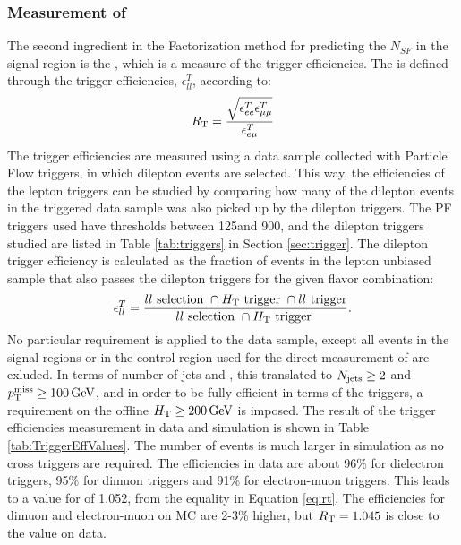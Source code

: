 \subsubsection*{Measurement of \RT}\label{sec:rt}
\noindent
\justify
The second ingredient in the Factorization method for predicting the $N_{SF}$ in the signal region is the \RT, which is a measure of the trigger efficiencies. 
The \RT is defined through the trigger efficiencies, $\epsilon_{ll}^{T}$,  according to:
\begin{equation}
\label{eq:masterformulaExp}
    R_{\text{T}} = \frac{\sqrt{\epsilon^{T}_{ee}\epsilon^{T}_{\mu\mu}}}{\epsilon^{T}_{e\mu}}
\end{equation}                                               
The trigger efficiencies are measured using a data sample collected with Particle Flow \HT triggers, in which dilepton events are selected. 
This way, the efficiencies of the lepton triggers can be studied by comparing how many of the dilepton events in the \HT triggered data sample was also picked up by the dilepton triggers. 
The PF \HT triggers used have thresholds between 125\GeV and 900\GeV, and the dilepton triggers studied are listed in Table \ref{tab:triggers} in Section \ref{sec:trigger}. 
The dilepton trigger efficiency is calculated as the fraction of events in the lepton unbiased sample that also passes the dilepton triggers for the given flavor combination: 
\begin{equation}
\epsilon_{ll}^{T} =\frac{ll\text{ selection }\cap H_{\mathrm{T}} \text{ trigger } \cap ll\text{ trigger}  }{ ll\text{ selection }\cap H_{\mathrm{T}} \text{ trigger }} .
\label{eq:rt}
\end{equation} 
No particular requirement is applied to the data sample, except all events in the signal regions or in the \ttbar control region used for the direct measurement of \Rsfof are exluded. 
In terms of number of jets and \ptmiss, this translated to $N_{\mathrm{jets}}\geq2$ and $p_{\mathrm{T}}^\text{miss}\geq100\,\text{Ge\hspace{-.08em}V}$, and in order to be fully efficient in terms of the \HT triggers, a requirement on the offline $H_{\mathrm{T}}\geq200\,\text{Ge\hspace{-.08em}V}$ is imposed.  
The result of the trigger efficiencies measurement in data and simulation is shown in Table \ref{tab:TriggerEffValues}. 
The number of events is much larger in simulation as no \HT cross triggers are required.
The efficiencies in data are about 96\% for dielectron triggers, 95\% for dimuon triggers and 91\% for electron-muon triggers. 
This leads to a value for \RT of 1.052, from the equality in Equation \ref{eq:rt}. 
The efficiencies for dimuon and electron-muon on MC are 2-3\% higher, but $R_{\text{T}}=1.045$ is close to the value on data.
